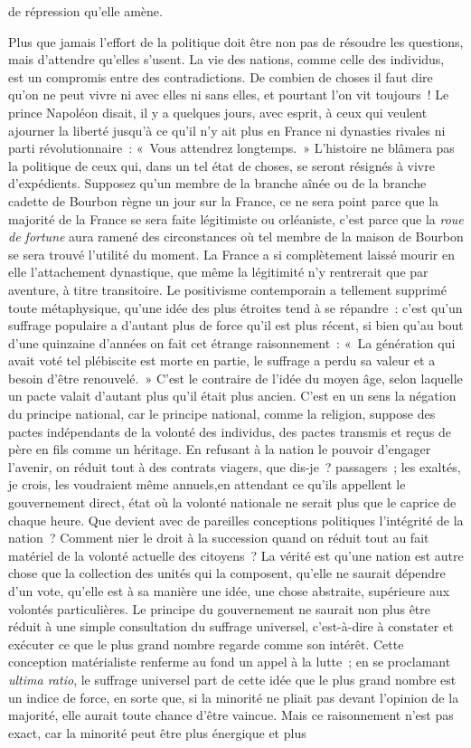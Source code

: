\documentclass[french,twoside]{book} %
\begin{document}
de répression qu’elle amène.\par
Plus que jamais l’effort de la politique doit être non pas de résoudre les questions, mais d’attendre qu’elles s’usent. La vie des nations, comme celle des individus, est un compromis entre des contradictions. De combien de choses il faut dire qu’on ne peut vivre ni avec elles ni sans elles, et pourtant l’on vit toujours ! Le prince Napoléon disait, il y a quelques jours, avec esprit, à ceux qui veulent ajourner la liberté jusqu’à ce qu’il n’y ait plus en France ni dynasties rivales ni parti révolutionnaire : « Vous attendrez longtemps. » L’histoire ne blâmera pas la politique de ceux qui, dans un tel état de choses, se seront résignés à vivre d’expédients. Supposez qu’un membre de la branche aînée ou de la branche cadette de Bourbon règne un jour sur la France, ce ne sera point parce que la majorité de la France se sera faite légitimiste ou orléaniste, c’est parce que la {\itshape roue de fortune} aura ramené des circonstances où tel membre de la maison de Bourbon se sera trouvé l’utilité du moment. La France a si complètement laissé mourir en elle l’attachement dynastique, que même la légitimité n’y rentrerait que par aventure, à titre transitoire. Le positivisme contemporain a tellement supprimé toute métaphysique, qu’une idée des plus étroites tend à se répandre : c’est qu’un suffrage populaire a d’autant plus de force qu’il est plus récent, si bien qu’au bout d’une quinzaine d’années on fait cet étrange raisonnement : « La génération qui avait voté tel plébiscite est morte en partie, le suffrage a perdu sa valeur et a besoin d’être renouvelé. » C’est le contraire de l’idée du moyen âge, selon laquelle un pacte valait d’autant plus qu’il était plus ancien. C’est en un sens la négation du principe national, car le principe national, comme la religion, suppose des pactes indépendants de la volonté des individus, des pactes transmis et reçus de père en fils comme un héritage. En refusant à la nation le pouvoir d’engager l’avenir, on réduit tout à des contrats viagers, que dis-je ? passagers ; les exaltés, je crois, les voudraient même annuels,en attendant ce qu’ils appellent le gouvernement direct, état où la volonté nationale ne serait plus que le caprice de chaque heure. Que devient avec de pareilles conceptions politiques l’intégrité de la nation ? Comment nier le droit à la succession quand on réduit tout au fait matériel de la volonté actuelle des citoyens ? La vérité est qu’une nation est autre chose que la collection des unités qui la composent, qu’elle ne saurait dépendre d’un vote, qu’elle est à sa manière une idée, une chose abstraite, supérieure aux volontés particulières. Le principe du gouvernement ne saurait non plus être réduit à une simple consultation du suffrage universel, c’est-à-dire à constater et exécuter ce que le plus grand nombre regarde comme son intérêt. Cette conception matérialiste renferme au fond un appel à la lutte ; en se proclamant {\itshape ultima ratio}, le suffrage universel part de cette idée que le plus grand nombre est un indice de force, en sorte que, si la minorité ne pliait pas devant l’opinion de la majorité, elle aurait toute chance d’être vaincue. Mais ce raisonnement n’est pas exact, car la minorité peut être plus énergique et plus 
\end{document}
